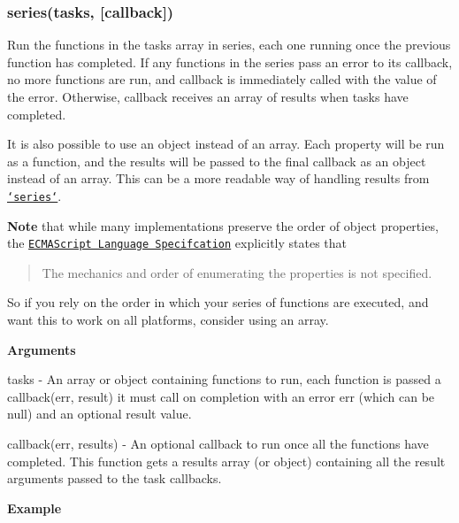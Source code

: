 \label{_series}%
 \subsubsection*{series(tasks, \mbox{[}callback\mbox{]})}

Run the functions in the {\ttfamily tasks} array in series, each one running once the previous function has completed. If any functions in the series pass an error to its callback, no more functions are run, and {\ttfamily callback} is immediately called with the value of the error. Otherwise, {\ttfamily callback} receives an array of results when {\ttfamily tasks} have completed.

It is also possible to use an object instead of an array. Each property will be run as a function, and the results will be passed to the final {\ttfamily callback} as an object instead of an array. This can be a more readable way of handling results from \href{#series}{\tt `series`}.

{\bfseries Note} that while many implementations preserve the order of object properties, the \href{http://www.ecma-international.org/ecma-262/5.1/#sec-8.6}{\tt E\+C\+M\+A\+Script Language Specifcation} explicitly states that

\begin{quote}
The mechanics and order of enumerating the properties is not specified. \end{quote}


So if you rely on the order in which your series of functions are executed, and want this to work on all platforms, consider using an array.

{\bfseries Arguments}


\begin{DoxyItemize}
\item {\ttfamily tasks} -\/ An array or object containing functions to run, each function is passed a {\ttfamily callback(err, result)} it must call on completion with an error {\ttfamily err} (which can be {\ttfamily null}) and an optional {\ttfamily result} value.
\item {\ttfamily callback(err, results)} -\/ An optional callback to run once all the functions have completed. This function gets a results array (or object) containing all the result arguments passed to the {\ttfamily task} callbacks.
\end{DoxyItemize}

{\bfseries Example}


